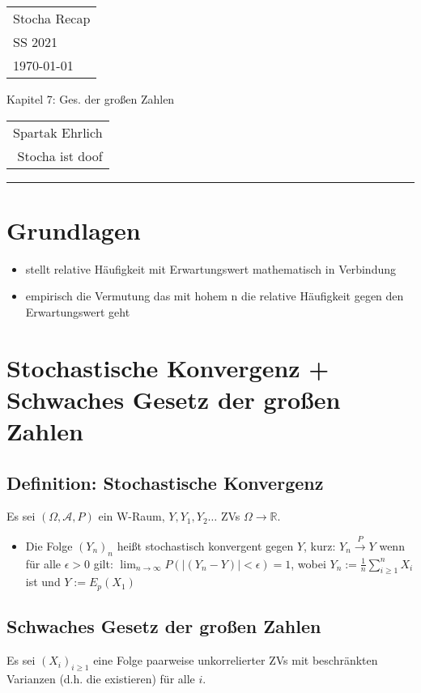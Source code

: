 \documentclass[a4paper,11pt]{scrartcl}
\begin{document}
{\raggedright
\begin{tabular}{l}
    Stocha Recap \\
    SS 2021 \\
    \today{}
\end{tabular}}
\hfill
{\Large Kapitel 7: Ges. der großen Zahlen} 
\hfill
\begin{tabular}{r}
    Spartak Ehrlich \\
    Stocha ist doof
\end{tabular}
\hrule

\section{Grundlagen}

\begin{itemize}
    \item stellt relative Häufigkeit mit Erwartungswert mathematisch in Verbindung
    \item empirisch die Vermutung das mit hohem n die relative Häufigkeit gegen den Erwartungswert geht
\end{itemize}

\section{Stochastische Konvergenz + Schwaches Gesetz der großen Zahlen}
\subsection{Definition: Stochastische Konvergenz}
Es sei $(\Omega, \mathcal{A},P)$ ein W-Raum, $Y,Y_1,Y_2\dots$ ZVs $\Omega \rightarrow \mathbb{R}$.

\begin{itemize}
    \item         
    Die Folge $(Y_n)_n$ heißt stochastisch konvergent gegen $Y$, kurz: $Y_n \stackrel{P}{\rightarrow} Y$ wenn für alle $\epsilon > 0$ gilt: $\lim_{n \rightarrow \infty} P(|(Y_n - Y)| < \epsilon) = 1$, wobei $Y_n := \frac{1}{n} \sum_{i \geq 1}^n X_i$ ist und $Y := E_p(X_1)$
\end{itemize}

\subsection{Schwaches Gesetz der großen Zahlen}
Es sei $(X_i)_{i \geq 1}$ eine Folge paarweise unkorrelierter ZVs mit beschränkten Varianzen (d.h. die existieren) für alle $i$.
\end{document}
